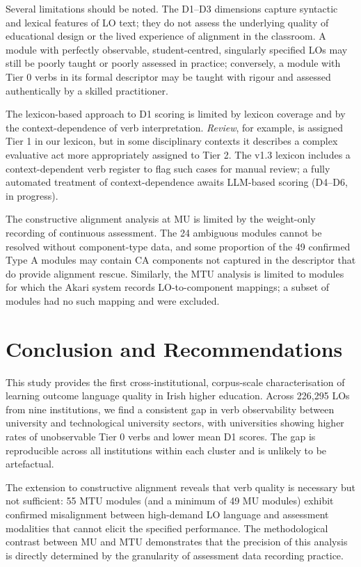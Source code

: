 \documentclass[12pt, a4paper]{article}
\begin{document}
Several limitations should be noted. The D1--D3 dimensions capture syntactic and
lexical features of LO text; they do not assess the underlying quality of educational
design or the lived experience of alignment in the classroom. A module with perfectly
observable, student-centred, singularly specified LOs may still be poorly taught or
poorly assessed in practice; conversely, a module with Tier 0 verbs in its formal
descriptor may be taught with rigour and assessed authentically by a skilled practitioner.

The lexicon-based approach to D1 scoring is limited by lexicon coverage and by the
context-dependence of verb interpretation. \textit{Review}, for example, is assigned
Tier 1 in our lexicon, but in some disciplinary contexts it describes a complex
evaluative act more appropriately assigned to Tier 2. The v1.3 lexicon includes
a context-dependent verb register to flag such cases for manual review; a fully
automated treatment of context-dependence awaits LLM-based scoring (D4--D6, in progress).

The constructive alignment analysis at MU is limited by the weight-only recording of
continuous assessment. The 24 ambiguous modules cannot be resolved without
component-type data, and some proportion of the 49 confirmed Type A modules may
contain CA components not captured in the descriptor that do provide alignment rescue.
Similarly, the MTU analysis is limited to modules for which the Akari system records
LO-to-component mappings; a subset of modules had no such mapping and were excluded.

\section{Conclusion and Recommendations}
\label{sec:conclusion}

This study provides the first cross-institutional, corpus-scale characterisation of
learning outcome language quality in Irish higher education. Across 226,295 LOs from
nine institutions, we find a consistent gap in verb observability between university
and technological university sectors, with universities showing higher rates of
unobservable Tier 0 verbs and lower mean D1 scores. The gap is reproducible across
all institutions within each cluster and is unlikely to be artefactual.

The extension to constructive alignment reveals that verb quality is necessary but
not sufficient: 55 MTU modules (and a minimum of 49 MU modules) exhibit confirmed
misalignment between high-demand LO language and assessment modalities that cannot
elicit the specified performance. The methodological contrast between MU and MTU
demonstrates that the precision of this analysis is directly determined by the
granularity of assessment data recording practice.
\end{document}
